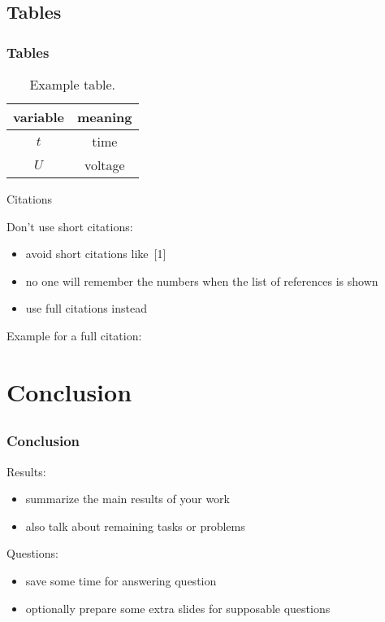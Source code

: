 \documentclass[aspectratio=3218]{beamer}
\begin{document}
\subsection{Tables}

\begin{frame}
	\frametitle<presentation>{Tables}
	\begin{table}
		\centering
			\begin{tabular}{cc}
				\toprule
				variable & meaning \\
				\midrule
				$t$ & time \\
				$U$ & voltage \\
				\bottomrule
			\end{tabular}
		\caption{Example table.}
		\label{tab:example}
	\end{table}
\end{frame}

\begin{frame}{Citations}
	\begin{block}{Don't use short citations:}
		\begin{itemize}
			\item avoid short citations like~[1]
			\item no one will remember the numbers when the list of references is shown
			\item use full citations instead
		\end{itemize}
	\end{block}
	\begin{block}{Example for a full citation:}
		\small{}
	\end{block}
\end{frame}

\section{Conclusion}

\subsection*{}

\begin{frame}
	\frametitle<presentation>{Conclusion}
	\begin{block}{Results:}
	  \begin{itemize}
	  	\item summarize the main results of your work
	  	\item also talk about remaining tasks or problems	  	
		\end{itemize}
	\end{block}
	\begin{block}{Questions:}
	 \begin{itemize}
	 	\item save some time for answering question
	 	\item optionally prepare some extra slides for supposable questions
	 \end{itemize}
	\end{block}	
\end{frame}
\end{document}
